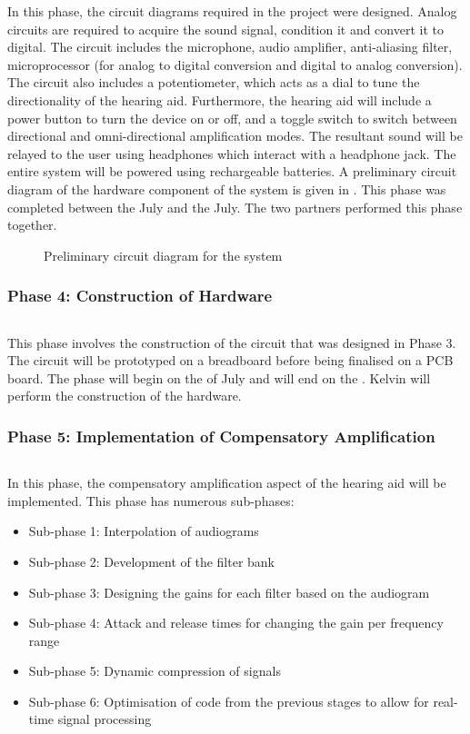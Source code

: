 \documentclass[10pt,twocolumn]{witseiepaper}
\begin{document}
In this phase, the circuit diagrams required in the project were designed. Analog circuits are required to acquire the sound signal, condition it and convert it to digital. The circuit includes the microphone, audio amplifier, anti-aliasing filter, microprocessor (for analog to digital conversion and digital to analog conversion). The circuit also includes a potentiometer, which acts as a dial to tune the directionality of the hearing aid. Furthermore, the hearing aid will include a power button to turn the device on or off, and a toggle switch to switch between directional and omni-directional amplification modes. The resultant sound will be relayed to the user using headphones which interact with a headphone jack. The entire system will be powered using rechargeable batteries. A preliminary circuit diagram of the hardware component of the system is given in . This phase was completed between the  July and the  July. The two partners performed this phase together.

\begin{figure}[h]
	\centering
	\caption{Preliminary circuit diagram for the system}
	\raggedright
	\label{fig:circuit}	
\end{figure}

\subsubsection*{Phase 4: Construction of Hardware } $    $

This phase involves the construction of the circuit that was designed in Phase 3. The circuit will be prototyped on a breadboard before being finalised on a PCB board. The phase will begin on the  of July and will end on the . Kelvin will perform the construction of the hardware.

\subsubsection*{Phase 5: Implementation of Compensatory Amplification} $    $

In this phase, the compensatory amplification aspect of the hearing aid will be implemented. This phase has numerous sub-phases:
\begin{itemize}
	\item Sub-phase 1: Interpolation of audiograms 
	\item Sub-phase 2: Development of the filter bank
	\item Sub-phase 3: Designing the gains for each filter based on the audiogram
	\item Sub-phase 4: Attack and release times for changing the gain per frequency range 
	\item Sub-phase 5: Dynamic compression of signals
	\item Sub-phase 6: Optimisation of code from the previous stages to allow for real-time signal processing
\end{itemize}
\end{document}
